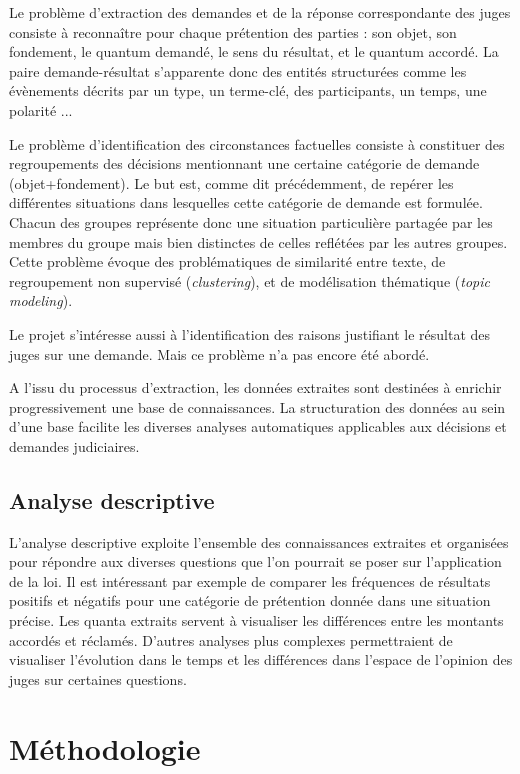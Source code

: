 Le problème d'extraction des demandes et de la réponse correspondante des juges consiste à reconnaître pour chaque prétention des parties : son objet, son fondement, le quantum demandé, le sens du résultat, et le quantum accordé. La paire demande-résultat s'apparente donc des entités structurées comme les évènements \cite{ace2005event} décrits par un type, un terme-clé, des participants, un temps, une polarité ... 

Le problème d'identification des circonstances factuelles consiste à constituer des regroupements des décisions mentionnant une certaine catégorie de demande (objet+fondement). Le but est, comme dit précédemment, de repérer les différentes situations dans lesquelles cette catégorie de demande est formulée. Chacun des groupes représente donc une situation particulière partagée par les membres du groupe mais bien distinctes de celles reflétées par les autres groupes. Cette problème évoque des problématiques de similarité entre texte, de regroupement non supervisé (\textit{clustering}), et de \og modélisation thématique \fg{} (\textit{topic modeling}).

Le projet s'intéresse aussi à l'identification des raisons justifiant le résultat des juges sur une demande. Mais ce problème n'a pas encore été abordé. 

A l'issu du processus d'extraction, les données extraites sont destinées à enrichir progressivement une base de connaissances. La structuration des données au sein d'une base facilite les diverses analyses automatiques applicables aux décisions et demandes judiciaires. 

\subsection{Analyse descriptive}
L'analyse descriptive exploite l'ensemble des connaissances extraites et organisées pour répondre aux diverses questions que l'on pourrait se poser sur l'application de la loi. Il est intéressant par exemple de comparer les fréquences de résultats positifs et négatifs pour une catégorie de prétention donnée dans une situation précise. Les quanta extraits servent à visualiser les différences entre les montants accordés et réclamés. D'autres analyses plus complexes permettraient de visualiser l'évolution dans le temps et les différences dans l'espace de l'opinion des juges sur certaines questions.


\section{Méthodologie}
\label{sec:intro:methodologie}


